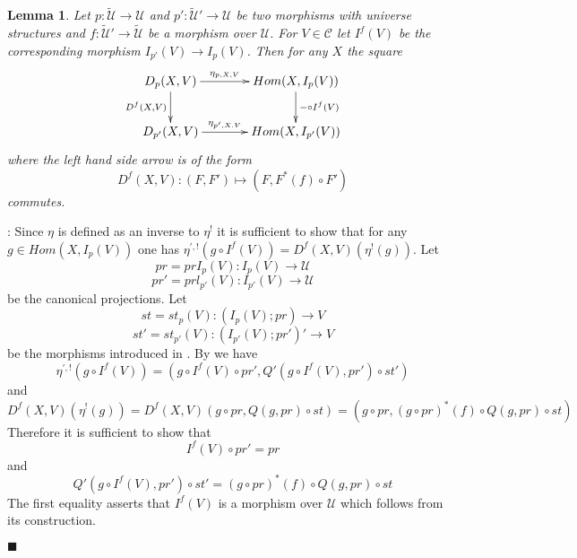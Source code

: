 \documentclass[12pt]{article}
\numberwithin{equation}{section}
\newenvironment{myproof}{{\bf Proof}:}{$\blacksquare$ \vskip 5mm }
\newtheorem{lemma}[proposition]{Lemma}
\newcommand{\llabel}[1]{\label{#1}}
\newcommand{\sr}{\rightarrow}
\newcommand{\wt}{\widetilde}
\newcommand{\U}{\mathcal{U}}
\begin{document}
%
%
\begin{lemma}
\llabel{2015.04.02.l4} Let $p:\wt{\U}\sr \U$ and $p':\wt{\U}'\sr \U$ be two
morphisms with universe structures and $f:\wt{\U}'\sr \wt{\U}$ be a morphism over
$\U$. For $V\in {\mathcal C}$ let $I^f(V)$ be the corresponding morphism
$I_{p'}(V)\sr I_p(V)$. Then for any $X$ the square
%
$$
\begin{xy}
          \xymatrix@C=3pc{ D_p(X,V) \ar[r]^-{\eta_{p,X,V}} \ar[d]_{D^f(X,V)} &
            Hom(X, I_p(V)) \ar[d]^{-\circ I^f(V)}\\ D_{p'}(X,V)
            \ar[r]^-{\eta_{p',X.V}} & Hom (X, I_{p'}(V)) }
\end{xy}
$$
%
where the left hand side arrow is of the form
%
$$D^f(X,V):(F, F')\mapsto (F,F^*(f)\circ F')$$
%
commutes.
\end{lemma}
%
\begin{myproof}
Since $\eta$ is defined as an inverse to $\eta^!$ it is sufficient to show that
for any $g\in Hom(X,I_p(V))$ one has $\eta^{',!}(g\circ
I^f(V))=D^f(X,V)(\eta^!(g))$. Let
%
$$pr=prI_p(V):I_p(V)\sr \U$$
$$pr'=prl_{p'}(V):I_{p'}(V)\sr \U$$
%
be the canonical projections. Let
%
$$st=st_p(V):(I_p(V);pr)\sr V$$
$$st'=st_{p'}(V):(I_{p'}(V);pr')'\sr V$$
%
be the morphisms introduced in \cite{fromunivwithPi}. By \cite[Problem
  3.8]{fromunivwithPi} we have
%
$$\eta^{',!}(g\circ I^f(V))=(g\circ I^f(V)\circ pr', Q'(g\circ I^f(V),
pr')\circ st')$$
%
and
%
$$D^f(X,V)(\eta^!(g))=D^f(X,V)(g\circ pr, Q(g,pr)\circ st)=(g\circ pr, (g\circ
pr)^*(f)\circ Q(g,pr)\circ st)$$
%
Therefore it is sufficient to show that
%
$$I^f(V)\circ pr'=pr$$
%
and
%
$$Q'(g\circ I^f(V), pr')\circ st'=(g\circ pr)^*(f)\circ Q(g,pr)\circ st$$
%
The first equality asserts that $I^f(V)$ is a morphism over $\U$ which follows
from its construction.


\end{myproof}
\end{document}
